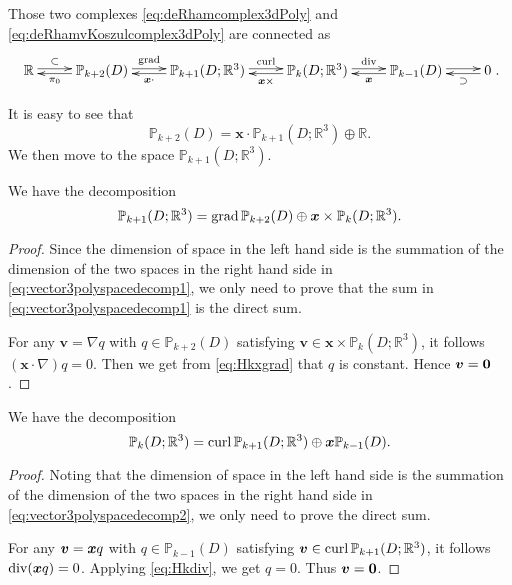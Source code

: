 Those two complexes \eqref{eq:deRhamcomplex3dPoly} and \eqref{eq:deRhamvKoszulcomplex3dPoly} are connected as
\begin{equation}\label{eq:divdivcomplex3dPolydouble}
\xymatrix{
\mathbb R\ar@<0.4ex>[r]^-{\subset} & \mathbb P_{k+2}(D)\ar@<0.4ex>[r]^-{\grad}\ar@<0.4ex>[l]^-{\pi_{0}} & \mathbb P_{k+1}(D; \mathbb R^3)\ar@<0.4ex>[r]^-{\curl}\ar@<0.4ex>[l]^-{\boldsymbol x\cdot}  & \mathbb P_k(D; \mathbb R^3) \ar@<0.4ex>[r]^-{\div}\ar@<0.4ex>[l]^-{\boldsymbol x\times} & \mathbb P_{k-1}(D)  \ar@<0.4ex>[r]^-{} \ar@<0.4ex>[l]^-{\boldsymbol x}
& 0 \ar@<0.4ex>[l]^-{\supset} }.
\end{equation}

It is easy to see that
\[
\mathbb P_{k+2}(D)= \boldsymbol x\cdot\mathbb P_{k+1}(D; \mathbb R^3)\oplus\mathbb R.
\]
We then move to the space $\mathbb P_{k+1}(D; \mathbb R^3)$.
\begin{lemma}
We have the decomposition
\begin{equation}\label{eq:vector3polyspacedecomp1}
\mathbb P_{k+1}(D; \mathbb R^3)=\operatorname{grad}\mathbb P_{k+2}(D)\oplus\boldsymbol x\times\mathbb P_k(D; \mathbb R^3).
\end{equation}
\end{lemma}
\begin{proof}
Since the dimension of space in the left hand side is the summation of the dimension of the two spaces in the right hand side in \eqref{eq:vector3polyspacedecomp1}, we only need to prove that the sum in \eqref{eq:vector3polyspacedecomp1} is the direct sum.

For any $\boldsymbol v=\nabla q$ with $q\in\mathbb P_{k+2}(D)$ satisfying $\boldsymbol v\in\boldsymbol x\times\mathbb P_k(D; \mathbb R^3)$, it follows $(\boldsymbol x\cdot\nabla)q=0$. Then we get from \eqref{eq:Hkxgrad} that $q$ is constant. Hence $\boldsymbol v=\boldsymbol0$.
\end{proof}

\begin{lemma}
We have the decomposition
\begin{equation}\label{eq:vector3polyspacedecomp2}
\mathbb P_{k}(D; \mathbb R^3)=\operatorname{curl}\mathbb P_{k+1}(D;\mathbb R^3)\oplus \boldsymbol x\mathbb P_{k-1}(D).
\end{equation}
\end{lemma}
\begin{proof}
 Noting that the dimension of space in the left hand side is the summation of the dimension of the two spaces in the right hand side in \eqref{eq:vector3polyspacedecomp2}, we only need to prove the direct sum.

For any $\boldsymbol v=\boldsymbol x q$ with $q\in\mathbb P_{k-1}(D)$ satisfying $\boldsymbol v\in\operatorname{curl}\mathbb P_{k+1}(D;\mathbb R^3)$, it follows $\operatorname{div}(\boldsymbol x q)=0$. 
Applying \eqref{eq:Hkdiv}, we get $q=0$. Thus $\boldsymbol v=\boldsymbol0$.
\end{proof}

